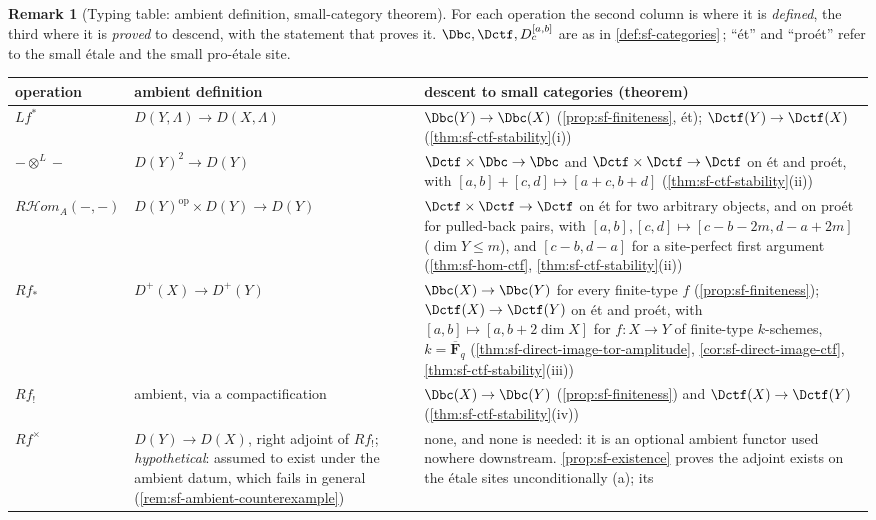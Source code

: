 \documentclass[11pt]{article}
\theoremstyle{plain}
\theoremstyle{definition}
\newtheorem{remark}[theorem]{Remark}
\newcommand{\Cref}[1]{\hyperref[#1]{\ref{#1}}\,\hyperref[#1]{\nameref*{#1}}}
\newcommand{\RHom}{R\mathcal Hom_A}
\begin{document}
\noindent\begin{minipage}{\linewidth}
\begin{remark}[Typing table: ambient definition, small-category theorem]
\label{rem:sf-typing}
For each operation the second column is where it is \emph{defined}, the third
where it is \emph{proved} to descend, with the statement that proves it.
$\Dbc,\Dctf,D_c^{[a,b]}$ are as in \Cref{def:sf-categories}; ``\'et'' and
``pro\'et'' refer to the small \'etale and the small pro-\'etale site.
\begin{center}\footnotesize
\begingroup
\renewcommand{\Cref}[1]{\hyperref[#1]{\ref*{#1}}}
\renewcommand{\arraystretch}{1.15}
\begin{tabular}{@{}p{2.0cm}p{4.3cm}p{7.6cm}@{}}
\hline
operation & ambient definition & descent to small categories (theorem) \\
\hline
$Lf^*$ & $D(Y,\Lambda)\to D(X,\Lambda)$ &
$\Dbc(Y)\to\Dbc(X)$ (\Cref{prop:sf-finiteness}, \'et);
$\Dctf(Y)\to\Dctf(X)$ (\Cref{thm:sf-ctf-stability}(i)) \\
$-\otimes^L-$ & $D(Y)^2\to D(Y)$ &
$\Dctf\times\Dbc\to\Dbc$ and $\Dctf\times\Dctf\to\Dctf$ on \'et and pro\'et,
with $[a,b]+[c,d]\mapsto[a+c,b+d]$ (\Cref{thm:sf-ctf-stability}(ii)) \\
$\RHom(-,-)$ & $D(Y)^{\mathrm{op}}\times D(Y)\to D(Y)$ &
$\Dctf\times\Dctf\to\Dctf$ on \'et for two arbitrary objects, and on pro\'et
for pulled-back pairs, with $[a,b],[c,d]\mapsto[c-b-2m,d-a+2m]$ ($\dim Y\le m$),
and $[c-b,d-a]$ for a site-perfect first argument
(\Cref{thm:sf-hom-ctf}, \Cref{thm:sf-ctf-stability}(ii)) \\
$Rf_*$ & $D^+(X)\to D^+(Y)$ &
$\Dbc(X)\to\Dbc(Y)$ for every finite-type $f$
(\Cref{prop:sf-finiteness}); $\Dctf(X)\to\Dctf(Y)$ on \'et and pro\'et, with
$[a,b]\mapsto[a,b+2\dim X]$ for $f:X\to Y$ of finite-type $k$-schemes,
$k=\overline{\mathbf F}_q$ (\Cref{thm:sf-direct-image-tor-amplitude},
\Cref{cor:sf-direct-image-ctf}, \Cref{thm:sf-ctf-stability}(iii)) \\
$Rf_!$ & ambient, via a compactification &
$\Dbc(X)\to\Dbc(Y)$ (\Cref{prop:sf-finiteness}) and
$\Dctf(X)\to\Dctf(Y)$ (\Cref{thm:sf-ctf-stability}(iv)) \\
$Rf^{\times}$ & $D(Y)\to D(X)$, right adjoint of $Rf_!$; \emph{hypothetical}:
assumed to exist under the ambient datum, which fails in general
(\Cref{rem:sf-ambient-counterexample}) & none, and none is needed: it is an
optional ambient functor used nowhere downstream.  \Cref{prop:sf-existence}
proves the adjoint exists on the \'etale sites unconditionally (a); its

\end{tabular}
\end{center}
\end{remark}
\end{minipage}
\end{document}
